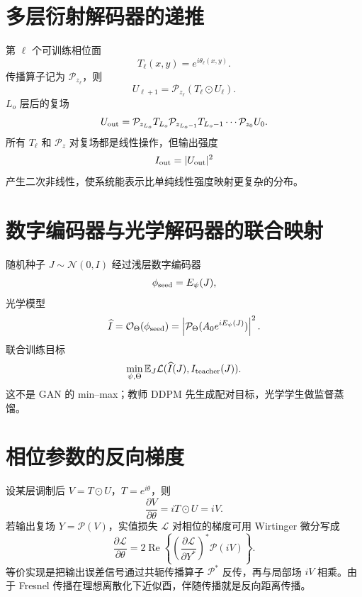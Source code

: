 \documentclass[UTF8,12pt,a4paper,fontset=none]{ctexart}
\numberwithin{equation}{section}
\newcommand{\E}{\mathbb{E}}
\newcommand{\Loss}{\mathcal{L}}
\begin{document}
\section{多层衍射解码器的递推}
第 $\ell$ 个可训练相位面
\begin{equation}
 T_\ell(x,y)=e^{i\theta_\ell(x,y)}.
\end{equation}
传播算子记为 $\mathcal P_{z_\ell}$，则
\begin{equation}
 U_{\ell+1}=\mathcal P_{z_\ell}(T_\ell\odot U_\ell).
\end{equation}
$L_o$ 层后的复场
\begin{equation}
 U_{\rm out}=\mathcal P_{z_{L_o}}
 T_{L_o}\mathcal P_{z_{L_o-1}}T_{L_o-1}\cdots\mathcal P_{z_0}U_0.
\end{equation}
所有 $T_\ell$ 和 $\mathcal P_z$ 对复场都是线性操作，但输出强度
\begin{equation}
 I_{\rm out}=|U_{\rm out}|^2
\end{equation}
产生二次非线性，使系统能表示比单纯线性强度映射更复杂的分布。

\section{数字编码器与光学解码器的联合映射}
随机种子 $J\sim\mathcal N(0,I)$ 经过浅层数字编码器
\begin{equation}
 \phi_{\rm seed}=E_\psi(J),
\end{equation}
光学模型
\begin{equation}
 \widehat I=\mathcal O_\Theta(\phi_{\rm seed})
 =\left|\mathcal P_\Theta(A_0e^{iE_\psi(J)})\right|^2.
\end{equation}
联合训练目标
\begin{equation}
 \min_{\psi,\Theta}\E_J\Loss(\widehat I(J),I_{\rm teacher}(J)).
\end{equation}
这不是 GAN 的 min--max；教师 DDPM 先生成配对目标，光学学生做监督蒸馏。

\section{相位参数的反向梯度}
设某层调制后 $V=T\odot U$，$T=e^{i\theta}$，则
\begin{equation}
 \frac{\partial V}{\partial\theta}=iT\odot U=iV.
\end{equation}
若输出复场 $Y=\mathcal P(V)$，实值损失 $\Loss$ 对相位的梯度可用 Wirtinger 微分写成
\begin{equation}
 \frac{\partial\Loss}{\partial\theta}
 =2\operatorname{Re}\left\{
 \left(\frac{\partial\Loss}{\partial Y^*}\right)^*
 \mathcal P(iV)
 \right\}.
\end{equation}
等价实现是把输出误差信号通过共轭传播算子 $\mathcal P^*$ 反传，再与局部场 $iV$ 相乘。由于 Fresnel 传播在理想离散化下近似酉，伴随传播就是反向距离传播。
\end{document}
